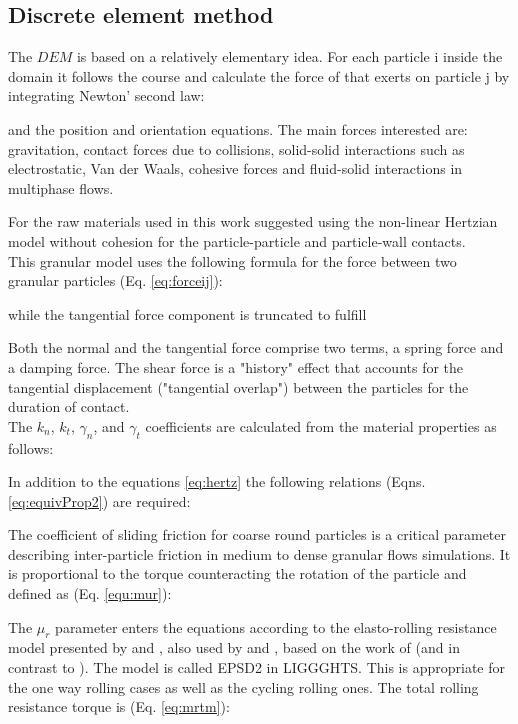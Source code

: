 \subsection{Discrete element method}
\label{subsec:dem}
The $DEM$ is based on a relatively elementary idea. For each particle i inside
the domain it follows the course and calculate the force of that exerts on particle j
by integrating Newton' second law:

and the position and orientation equations.
The main forces interested are: gravitation, contact forces due to collisions,
solid-solid interactions such as electrostatic, Van der Waals, cohesive forces
and fluid-solid interactions in multiphase flows.

For the raw materials used in this work \cite{RefWorks:145} suggested using the non-linear Hertzian model without cohesion for the particle-particle and particle-wall contacts.\\
This granular model uses the following formula for the force between two granular particles (Eq. \ref{eq:forceij}):

while the tangential force component is truncated to fulfill

Both the normal and the tangential force comprise two terms, a spring force and a damping force. The shear force is a "history" effect that accounts for the tangential displacement 
("tangential overlap") between the particles for the duration of contact. \\

The $k_n$, $k_t$, $\gamma_n$, and $\gamma_t$ coefficients are calculated from the material properties as follows:

In addition to the equations \ref{eq:hertz} the following relations (Eqns. \ref{eq:equivProp2}) are required:

The coefficient of sliding friction for coarse round particles is a critical
parameter describing inter-particle friction in medium to dense granular flows simulations.
It is proportional to the torque counteracting the rotation of the particle and defined as (Eq. \ref{equ:mur}):

The $\mu_r$ parameter enters the equations according to the elasto-rolling
resistance model presented by \cite{RefWorks:87} and \cite{RefWorks:131}, also
used by \cite{RefWorks:147} and \cite{RefWorks:173}, based on the work of
\cite{RefWorks:143}(and in contrast to \cite{RefWorks:144}). The model is called EPSD2 in LIGGGHTS.
This is appropriate for the one way rolling cases as well as the cycling rolling ones.
The total rolling resistance torque is (Eq. \ref{eq:mrtm}):


